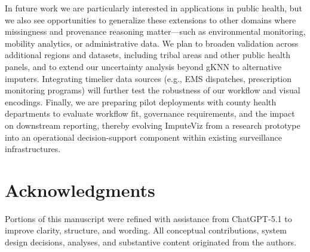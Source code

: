 \documentclass{egpubl}
\newcommand{\tool}{ImputeViz\xspace}
\begin{document}
In future work we are particularly interested in applications in public health, but we also see opportunities to generalize these extensions to other domains where missingness and provenance reasoning matter—such as environmental monitoring, mobility analytics, or administrative data. We plan to broaden validation across additional regions and datasets, including tribal areas and other public health panels, and to extend our uncertainty analysis beyond gKNN to alternative imputers. Integrating timelier data sources (e.g., EMS dispatches, prescription monitoring programs) will further test the robustness of our workflow and visual encodings. Finally, we are preparing pilot deployments with county health departments to evaluate workflow fit, governance requirements, and the impact on downstream reporting, thereby evolving \tool from a research prototype into an operational decision-support component within existing surveillance infrastructures.

\vspace{-6pt}
\section*{Acknowledgments}
Portions of this manuscript were refined with assistance from ChatGPT-5.1 to improve clarity, structure, and wording. All conceptual contributions, system design decisions, analyses, and substantive content originated from the authors.


\newpage

\end{document}
